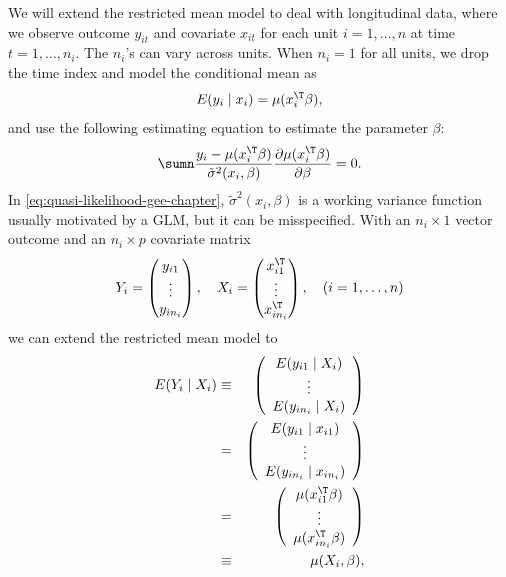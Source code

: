We will extend the restricted mean model to deal with longitudinal
data, where we observe outcome $y_{it}$ and covariate $x_{it}$ for
each unit $i=1,\ldots,n$ at time $t=1,\ldots,n_{i}.$ The $n_i$'s can vary across units. When $n_{i}=1$
for all units, we drop the time index and model the conditional mean
as 
\[
E(y_{i}\mid x_{i})=\mu(x_{i}^{\T}\beta),
\]
and use the following estimating equation  
to estimate the parameter $\beta$:
\begin{equation}
\sumn\frac{y_{i}-\mu(x_{i}^{\T}\beta)}{\tilde{\sigma}^{2}(x_{i}, \beta)}\frac{\partial\mu(x_{i}^{\T}\beta)}{\partial\beta}=0 . \label{eq:quasi-likelihood-gee-chapter}
\end{equation}
In \eqref{eq:quasi-likelihood-gee-chapter},  $\tilde{\sigma}^{2}(x_{i}, \beta)$ is a working variance function usually motivated by a GLM, but it can be misspecified. With an $n_{i}\times1$ vector outcome and  an $n_{i}\times p$ covariate matrix
\begin{eqnarray}
\label{eq::individual-y-x}
Y_{i} = \begin{pmatrix}
y_{i1} \\
\vdots \\
y_{in_{i}}
\end{pmatrix},\quad 
X_{i} = \begin{pmatrix}
x_{i1}^{\T} \\
\vdots \\
x_{in_{i}}^{\T}
\end{pmatrix},\quad
(i=1,\ldots, n)
\end{eqnarray}
we can extend the restricted mean model to
\begin{eqnarray}
E(Y_{i}\mid X_{i}) 
&\equiv& \left(\begin{array}{c}
E(y_{i1}\mid X_{i})\\
\vdots\\
E(y_{in_{i}}\mid X_{i})
\end{array}\right)  \label{eq::def1-gee} \\
&=& \left(\begin{array}{c}
E(y_{i1}\mid x_{i1})\\
\vdots\\
E(y_{in_{i}}\mid x_{in_{i}})
\end{array}\right)  \label{eq::gee-assumtion-1} \\
&=&\left(\begin{array}{c}
\mu(x_{i1}^{\T}\beta)\\
\vdots\\
\mu(x_{in_{i}}^{\T}\beta)
\end{array}\right)   \label{eq::gee-assumtion-2} \\
&\equiv&\mu(X_{i},\beta), \label{eq::def2-gee}
\end{eqnarray}

